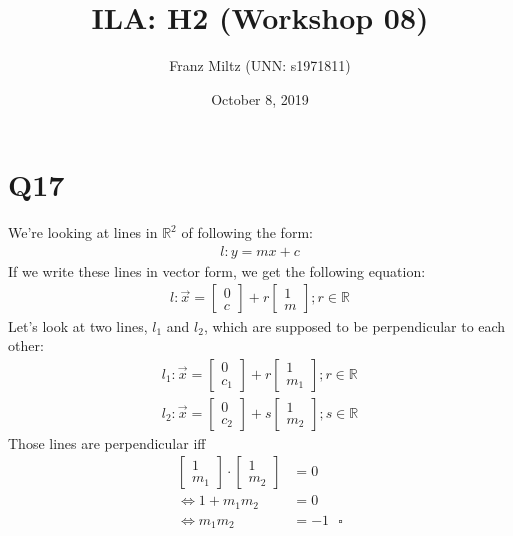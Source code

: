 \documentclass{article}
\title{ILA: H2 (Workshop 08)}
\author{Franz Miltz (UNN: s1971811)}
\date{October 8, 2019}
\begin{document}
\maketitle
\section*{Q17}
We're looking at lines in $\mathbb{R}^2$ of following the form:
\begin{align}
    l: y = mx + c
\end{align}
If we write these lines in vector form, we get the following equation:
\begin{align}
    l: \vec x =
    \begin{bmatrix}
        0\\
        c
    \end{bmatrix}
    + r \begin{bmatrix}
        1\\
        m
    \end{bmatrix};
    r \in \mathbb{R}
\end{align}
Let's look at two lines, $l_1$ and $l_2$, which are supposed to be perpendicular to each other:
\begin{align}
    l_1: \vec x =
    \begin{bmatrix}
        0\\
        c_1
    \end{bmatrix}
    + r \begin{bmatrix}
        1\\
        m_1
    \end{bmatrix};
    r \in \mathbb{R}\\
    l_2: \vec x =
    \begin{bmatrix}
        0\\
        c_2
    \end{bmatrix}
    + s \begin{bmatrix}
        1\\
        m_2
    \end{bmatrix};
    s \in \mathbb{R}   
\end{align}
Those lines are perpendicular iff
\begin{align}
    \begin{bmatrix}
        1\\m_1
    \end{bmatrix}
    \cdot \begin{bmatrix}
        1\\m_2
    \end{bmatrix}
    &= 0\\
    \Leftrightarrow 1+m_1m_2 &=0\\ \Leftrightarrow m_1m_2 &= -1\:\:\:\square
\end{align}
\end{document}
